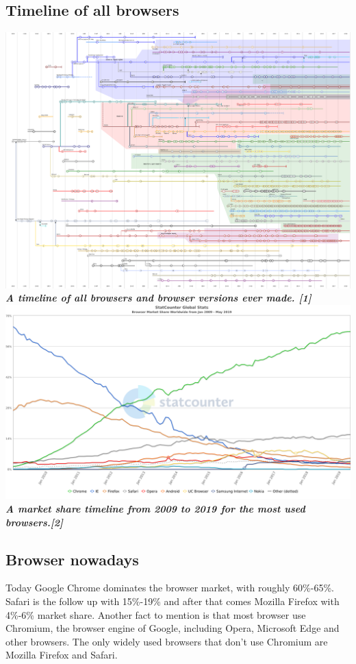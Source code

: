 \documentclass[runningheads]{llncs}
\begin{document}
		\subsection{Timeline of all browsers}	\includegraphics[scale=0.80]{TimelineOfWebBrowsers.png}
		\textit{\textbf{A timeline of all browsers and browser versions ever made. [1]}}\\
		\includegraphics[scale=0.35]{WebBrowserMarketShare.png}
		\textit{\textbf{A market share timeline from 2009 to 2019 for the most used browsers.[2]}}
		\subsection{Browser nowadays}
		Today Google Chrome dominates the browser market, with roughly 60\%-65\%. Safari is the follow up with 15\%-19\% and after that comes Mozilla Firefox with 4\%-6\% market share. Another fact to mention is that most browser use Chromium, the browser engine of Google, including Opera, Microsoft Edge and other browsers. The only widely used browsers that don't use Chromium are Mozilla Firefox and Safari.
\end{document}
